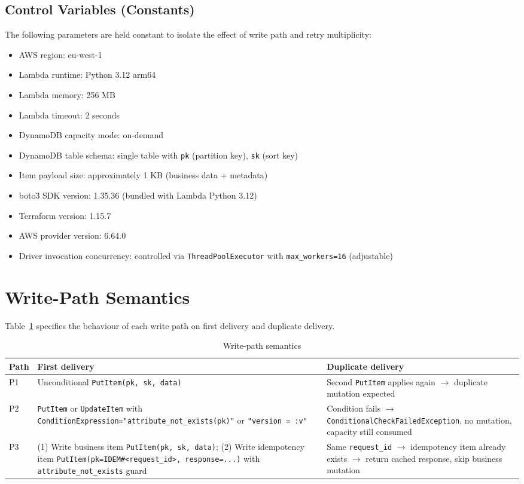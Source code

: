 \subsection{Control Variables (Constants)}

The following parameters are held constant to isolate the effect of write path and retry multiplicity:

\begin{itemize}
    \item AWS region: eu-west-1
    \item Lambda runtime: Python 3.12 arm64
    \item Lambda memory: 256 MB
    \item Lambda timeout: 2 seconds
    \item DynamoDB capacity mode: on-demand
    \item DynamoDB table schema: single table with \texttt{pk} (partition key), \texttt{sk} (sort key)
    \item Item payload size: approximately 1 KB (business data + metadata)
    \item boto3 SDK version: 1.35.36 (bundled with Lambda Python 3.12)
    \item Terraform version: 1.15.7
    \item AWS provider version: 6.64.0
    \item Driver invocation concurrency: controlled via \texttt{ThreadPoolExecutor} with \texttt{max\_workers=16} (adjustable)
\end{itemize}

\section{Write-Path Semantics}

Table~\ref{tab:write_paths} specifies the behaviour of each write path on first delivery and duplicate delivery.

\begin{table}[h]
\centering
\caption{Write-path semantics}
\label{tab:write_paths}
\begin{tabular}{p{2cm}p{5cm}p{5cm}}
\hline
\textbf{Path} & \textbf{First delivery} & \textbf{Duplicate delivery} \\
\hline
P1 & Unconditional \texttt{PutItem(pk, sk, data)} & Second \texttt{PutItem} applies again $\rightarrow$ duplicate mutation expected \\
\hline
P2 & \texttt{PutItem} or \texttt{UpdateItem} with \texttt{ConditionExpression="attribute\_not\_exists(pk)"} or \texttt{"version = :v"} & Condition fails $\rightarrow$ \texttt{ConditionalCheckFailedException}, no mutation, capacity still consumed \\
\hline
P3 & (1) Write business item \texttt{PutItem(pk, sk, data)}; (2) Write idempotency item \texttt{PutItem(pk=IDEM\#<request\_id>, response=...)} with \texttt{attribute\_not\_exists} guard & Same \texttt{request\_id} $\rightarrow$ idempotency item already exists $\rightarrow$ return cached response, skip business mutation \\
\hline
\end{tabular}
\end{table}

